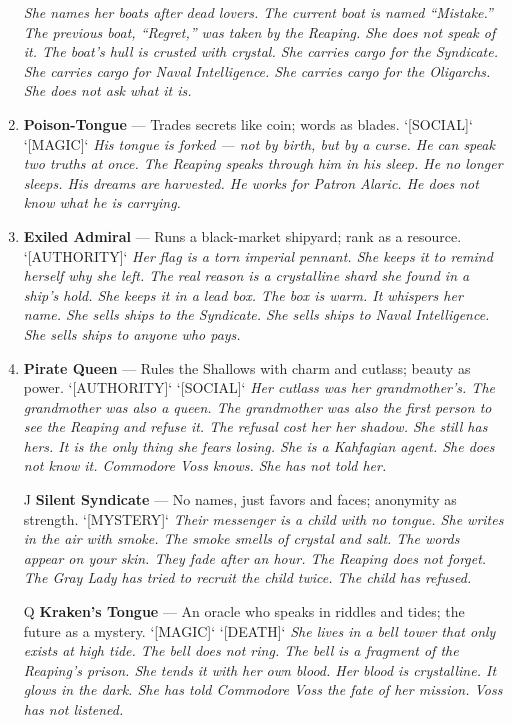 \begin{enumerate}
  \hfill \textit{She names her boats after dead lovers. The current boat is named ``Mistake.'' The previous boat, ``Regret,'' was taken by the Reaping. She does not speak of it. The boat's hull is crusted with crystal. She carries cargo for the Syndicate. She carries cargo for Naval Intelligence. She carries cargo for the Oligarchs. She does not ask what it is.}
\item \textbf{Poison-Tongue} --- Trades secrets like coin; words as blades. `[SOCIAL]` `[MAGIC]`
  \hfill \textit{His tongue is forked --- not by birth, but by a curse. He can speak two truths at once. The Reaping speaks through him in his sleep. He no longer sleeps. His dreams are harvested. He works for Patron Alaric. He does not know what he is carrying.}
\item \textbf{Exiled Admiral} --- Runs a black-market shipyard; rank as a resource. `[AUTHORITY]`
  \hfill \textit{Her flag is a torn imperial pennant. She keeps it to remind herself why she left. The real reason is a crystalline shard she found in a ship's hold. She keeps it in a lead box. The box is warm. It whispers her name. She sells ships to the Syndicate. She sells ships to Naval Intelligence. She sells ships to anyone who pays.}
\item \textbf{Pirate Queen} --- Rules the Shallows with charm and cutlass; beauty as power. `[AUTHORITY]` `[SOCIAL]`
  \hfill \textit{Her cutlass was her grandmother's. The grandmother was also a queen. The grandmother was also the first person to see the Reaping and refuse it. The refusal cost her her shadow. She still has hers. It is the only thing she fears losing. She is a Kahfagian agent. She does not know it. Commodore Voss knows. She has not told her.}
\item[J] \textbf{Silent Syndicate} --- No names, just favors and faces; anonymity as strength. `[MYSTERY]`
  \hfill \textit{Their messenger is a child with no tongue. She writes in the air with smoke. The smoke smells of crystal and salt. The words appear on your skin. They fade after an hour. The Reaping does not forget. The Gray Lady has tried to recruit the child twice. The child has refused.}
\item[Q] \textbf{Kraken's Tongue} --- An oracle who speaks in riddles and tides; the future as a mystery. `[MAGIC]` `[DEATH]`
  \hfill \textit{She lives in a bell tower that only exists at high tide. The bell does not ring. The bell is a fragment of the Reaping's prison. She tends it with her own blood. Her blood is crystalline. It glows in the dark. She has told Commodore Voss the fate of her mission. Voss has not listened.}

\end{enumerate}
